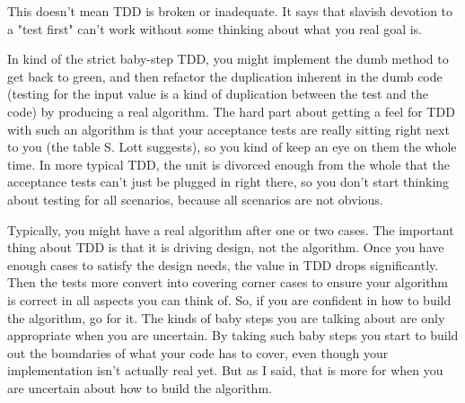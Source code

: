     This doesn't mean TDD is broken or inadequate. It says that slavish devotion to a "test first" can't work without some thinking about what you real goal is.

    In kind of the strict baby-step TDD, you might implement the dumb method to get back to green, and then refactor the duplication inherent in the dumb code (testing for the input value is a kind of duplication between the test and the code) by producing a real algorithm. The hard part about getting a feel for TDD with such an algorithm is that your acceptance tests are really sitting right next to you (the table S. Lott suggests), so you kind of keep an eye on them the whole time. In more typical TDD, the unit is divorced enough from the whole that the acceptance tests can't just be plugged in right there, so you don't start thinking about testing for all scenarios, because all scenarios are not obvious.

    Typically, you might have a real algorithm after one or two cases. The important thing about TDD is that it is driving design, not the algorithm. Once you have enough cases to satisfy the design needs, the value in TDD drops significantly. Then the tests more convert into covering corner cases to ensure your algorithm is correct in all aspects you can think of. So, if you are confident in how to build the algorithm, go for it. The kinds of baby steps you are talking about are only appropriate when you are uncertain. By taking such baby steps you start to build out the boundaries of what your code has to cover, even though your implementation isn't actually real yet. But as I said, that is more for when you are uncertain about how to build the algorithm.

